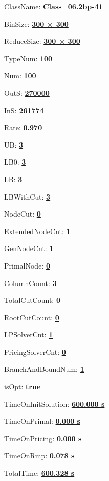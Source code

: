 \documentclass[11pt]{article}
\begin{document}
\pagestyle{empty}


ClassName: \underline{\textbf{Class_06.2bp-41}}
\par
BinSize: \underline{\textbf{300 × 300}}
\par
ReduceSize: \underline{\textbf{300 × 300}}
\par
TypeNum: \underline{\textbf{100}}
\par
Num: \underline{\textbf{100}}
\par
OutS: \underline{\textbf{270000}}
\par
InS: \underline{\textbf{261774}}
\par
Rate: \underline{\textbf{0.970}}
\par
UB: \underline{\textbf{3}}
\par
LB0: \underline{\textbf{3}}
\par
LB: \underline{\textbf{3}}
\par
LBWithCut: \underline{\textbf{3}}
\par
NodeCut: \underline{\textbf{0}}
\par
ExtendedNodeCnt: \underline{\textbf{1}}
\par
GenNodeCnt: \underline{\textbf{1}}
\par
PrimalNode: \underline{\textbf{0}}
\par
ColumnCount: \underline{\textbf{3}}
\par
TotalCutCount: \underline{\textbf{0}}
\par
RootCutCount: \underline{\textbf{0}}
\par
LPSolverCnt: \underline{\textbf{1}}
\par
PricingSolverCnt: \underline{\textbf{0}}
\par
BranchAndBoundNum: \underline{\textbf{1}}
\par
isOpt: \underline{\textbf{true}}
\par
TimeOnInitSolution: \underline{\textbf{600.000 s}}
\par
TimeOnPrimal: \underline{\textbf{0.000 s}}
\par
TimeOnPricing: \underline{\textbf{0.000 s}}
\par
TimeOnRmp: \underline{\textbf{0.078 s}}
\par
TotalTime: \underline{\textbf{600.328 s}}
\par
\newpage
\end{document}
